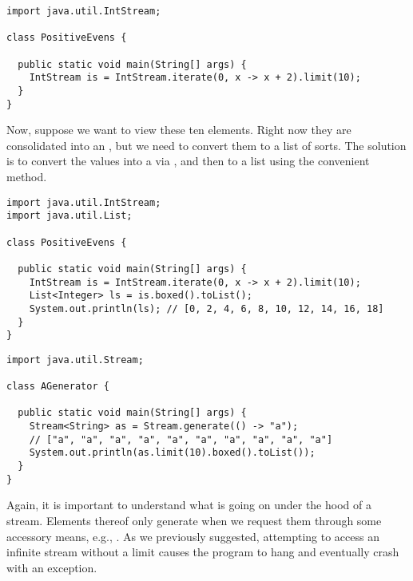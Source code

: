 \begin{cl}[]{}
\begin{lstlisting}[language=MyJava]
import java.util.IntStream;

class PositiveEvens {
  
  public static void main(String[] args) {
    IntStream is = IntStream.iterate(0, x -> x + 2).limit(10);
  }
}
\end{lstlisting}
\end{cl}
Now, suppose we want to view these ten elements. Right now they are consolidated into an , but we need to convert them to a list of sorts. The solution is to convert the values into a  via , and then to a list using the convenient  method.
\begin{cl}[]{}
\begin{lstlisting}[language=MyJava]
import java.util.IntStream;
import java.util.List;

class PositiveEvens {
  
  public static void main(String[] args) {
    IntStream is = IntStream.iterate(0, x -> x + 2).limit(10);
    List<Integer> ls = is.boxed().toList();
    System.out.println(ls); // [0, 2, 4, 6, 8, 10, 12, 14, 16, 18]
  }
}
\end{lstlisting}
\end{cl}

\begin{cl}[]{}
\begin{lstlisting}[language=MyJava]
import java.util.Stream;

class AGenerator {

  public static void main(String[] args) {
    Stream<String> as = Stream.generate(() -> "a");
    // ["a", "a", "a", "a", "a", "a", "a", "a", "a", "a"]
    System.out.println(as.limit(10).boxed().toList()); 
  } 
}
\end{lstlisting}
\end{cl}

Again, it is important to understand what is going on under the hood of a stream. Elements thereof only generate when we request them through some accessory means, e.g., . As we previously suggested, attempting to access an infinite stream without a limit causes the program to hang and eventually crash with an  exception.

